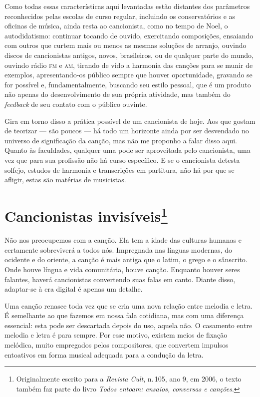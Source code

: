 Como todas essas características aqui levantadas estão distantes dos
parâmetros reconhecidos pelas escolas de curso regular, incluindo os
conservatórios e as oficinas de música, ainda resta ao cancionista,
como no tempo de Noel, o autodidatismo: continuar tocando de ouvido,
exercitando composições, ensaiando com outros que curtem mais ou menos
as mesmas soluções de arranjo, ouvindo discos de cancionistas antigos,
novos, brasileiros, ou de qualquer parte do mundo, ouvindo rádio \textsc{fm} e
\textsc{am}, tirando de vido a harmonia das canções para se munir de exemplos,
apresentando-os público sempre que houver oportunidade, gravando se for
possível e, fundamentalmente, buscando seu estilo pessoal, que é um
produto não apenas do desenvolvimento de sua própria atividade, mas
também do \textit{feedback} de seu contato com o público ouvinte.

Gira em torno disso a prática possível de um cancionista de hoje. Aos
que gostam de teorizar --- são poucos --- há todo um horizonte ainda por ser
desvendado no universo de significação da canção, mas não me proponho a
falar disso aqui. Quanto às faculdades, qualquer uma pode ser
aproveitada pelo cancionista, uma vez que para sua profissão não há
curso específico. E se o cancionista detesta solfejo, estudos de
harmonia e transcrições em partitura, não há por que se afligir, estas
são matérias de musicistas.



\chapter{Cancionistas invisíveis\footnote{Originalmente escrito para a \textit{Revista Cult}, n.\,105, ano 9, em 2006, o texto também faz parte do livro \textit{Todos entoam: ensaios, conversas e canções}.}}


Não nos preocupemos com a canção. Ela tem a idade das culturas humanas e
certamente sobreviverá a todos nós. Impregnada nas línguas modernas, do
ocidente e do oriente, a canção é mais antiga que o latim, o grego e o
sânscrito. Onde houve língua e vida comunitária, houve canção. Enquanto
houver seres falantes, haverá cancionistas convertendo suas falas em
canto. Diante disso, adaptar-se à era digital é apenas um detalhe.

Uma canção renasce toda vez que se cria uma nova relação entre melodia e
letra. É semelhante ao que fazemos em nossa fala cotidiana, mas com uma
diferença essencial: esta pode ser descartada depois do uso, aquela não.
O casamento entre melodia e letra é para sempre. Por esse motivo,
existem meios de fixação melódica, muito empregados pelos compositores,
que convertem impulsos entoativos em forma musical adequada para a
condução da letra.

